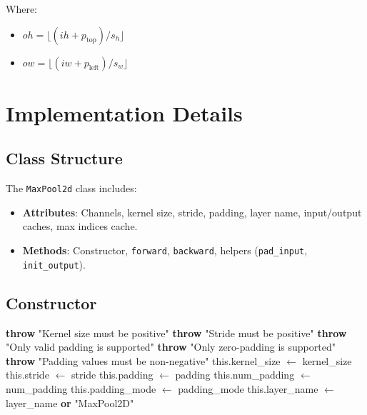 \documentclass{article}
\begin{document}
Where:
\begin{itemize}
    \item $oh = \lfloor (ih + p_{\text{top}}) / s_h \rfloor$
    \item $ow = \lfloor (iw + p_{\text{left}}) / s_w \rfloor$
\end{itemize}

\section{Implementation Details}

\subsection{Class Structure}
The \texttt{MaxPool2d} class includes:
\begin{itemize}
    \item \textbf{Attributes}: Channels, kernel size, stride, padding, layer name, input/output caches, max indices cache.
    \item \textbf{Methods}: Constructor, \texttt{forward}, \texttt{backward}, helpers (\texttt{pad_input}, \texttt{init_output}).
\end{itemize}

\subsection{Constructor}
\begin{algorithm}
\caption{MaxPool2d Constructor}
\begin{algorithmic}[1]
        \State \textbf{throw} "Kernel size must be positive"
    \EndIf
        \State \textbf{throw} "Stride must be positive"
    \EndIf
        \State \textbf{throw} "Only valid padding is supported"
    \EndIf
        \State \textbf{throw} "Only zero-padding is supported"
    \EndIf
        \State \textbf{throw} "Padding values must be non-negative"
    \EndIf
    \State this.kernel_size $\gets$ kernel_size
    \State this.stride $\gets$ stride
    \State this.padding $\gets$ padding
    \State this.num_padding $\gets$ num_padding
    \State this.padding_mode $\gets$ padding_mode
    \State this.layer_name $\gets$ layer_name \textbf{or} "MaxPool2D"
\EndFunction
\end{algorithmic}
\end{algorithm}
\end{document}
